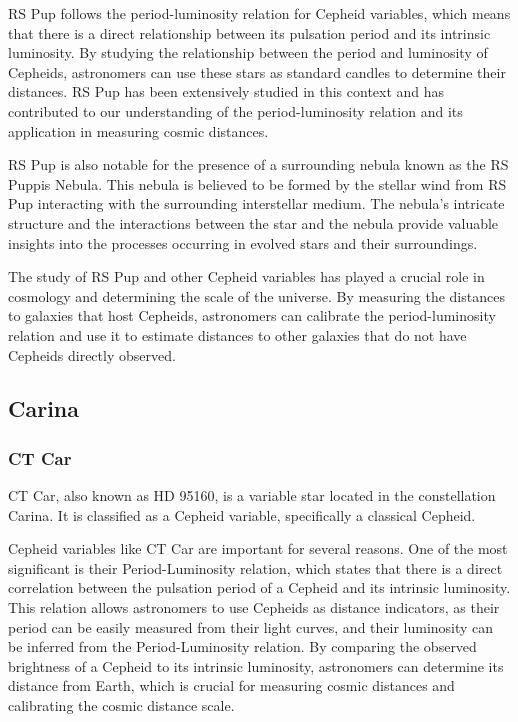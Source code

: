 RS Pup follows the period-luminosity relation for Cepheid variables, which means that there is a direct relationship between its pulsation period and its intrinsic luminosity. By studying the relationship between the period and luminosity of Cepheids, astronomers can use these stars as standard candles to determine their distances. RS Pup has been extensively studied in this context and has contributed to our understanding of the period-luminosity relation and its application in measuring cosmic distances.

RS Pup is also notable for the presence of a surrounding nebula known as the RS Puppis Nebula. This nebula is believed to be formed by the stellar wind from RS Pup interacting with the surrounding interstellar medium. The nebula's intricate structure and the interactions between the star and the nebula provide valuable insights into the processes occurring in evolved stars and their surroundings.

The study of RS Pup and other Cepheid variables has played a crucial role in cosmology and determining the scale of the universe. By measuring the distances to galaxies that host Cepheids, astronomers can calibrate the period-luminosity relation and use it to estimate distances to other galaxies that do not have Cepheids directly observed.

\subsection{Carina}
\subsubsection*{ CT Car }
CT Car, also known as HD 95160, is a variable star located in the constellation Carina. It is classified as a Cepheid variable, specifically a classical Cepheid.

Cepheid variables like CT Car are important for several reasons. One of the most significant is their Period-Luminosity relation, which states that there is a direct correlation between the pulsation period of a Cepheid and its intrinsic luminosity. This relation allows astronomers to use Cepheids as distance indicators, as their period can be easily measured from their light curves, and their luminosity can be inferred from the Period-Luminosity relation. By comparing the observed brightness of a Cepheid to its intrinsic luminosity, astronomers can determine its distance from Earth, which is crucial for measuring cosmic distances and calibrating the cosmic distance scale.

